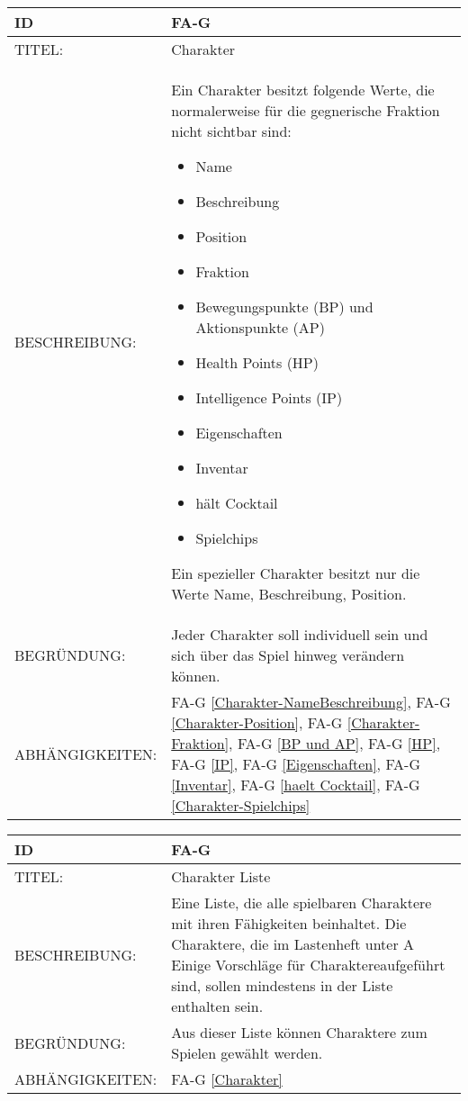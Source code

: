 \begin{tabularx}{16cm}{l|X}
	{table}\label{Charakter}
	\textbf{ID} & \textbf{FA-G \arabic{table}} \\
	\hline
	TITEL: & Charakter \\
	\hline
	BESCHREIBUNG: & Ein Charakter besitzt folgende Werte, die normalerweise für die gegnerische Fraktion nicht sichtbar sind: 
	\begin{itemize}
		\item Name
		\item Beschreibung
		\item Position
		\item Fraktion
		\item Bewegungspunkte (BP) und Aktionspunkte (AP)
		\item Health Points (HP)
		\item Intelligence Points (IP)
		\item Eigenschaften
		\item Inventar
		\item hält Cocktail
		\item Spielchips
	\end{itemize}
	Ein spezieller Charakter besitzt nur die Werte Name, Beschreibung, Position.
	\\
	\hline
	BEGRÜNDUNG: & Jeder Charakter soll individuell sein und sich über das Spiel hinweg verändern können.\\
	\hline
	ABHÄNGIGKEITEN: & FA-G \ref{Charakter-NameBeschreibung}, FA-G \ref{Charakter-Position}, FA-G \ref{Charakter-Fraktion},  FA-G \ref{BP und AP}, FA-G \ref{HP}, FA-G \ref{IP}, FA-G \ref{Eigenschaften}, FA-G \ref{Inventar}, FA-G \ref{haelt Cocktail}, FA-G \ref{Charakter-Spielchips} \\
\end{tabularx}

\begin{tabularx}{16cm}{l|X}
	{table}\label{Charakter Liste}
	\textbf{ID} & \textbf{FA-G \arabic{table}} \\
	\hline
	TITEL: & Charakter Liste \\
	\hline
	BESCHREIBUNG: & Eine Liste, die alle spielbaren Charaktere mit ihren Fähigkeiten beinhaltet. Die Charaktere, die im Lastenheft unter \glqq A Einige Vorschläge für Charaktere\grqq aufgeführt sind, sollen mindestens in der Liste enthalten sein.\\
	\hline
	BEGRÜNDUNG: & Aus dieser Liste können Charaktere zum Spielen gewählt werden.\\
	\hline
	ABHÄNGIGKEITEN: & FA-G \ref{Charakter}\\
\end{tabularx}

